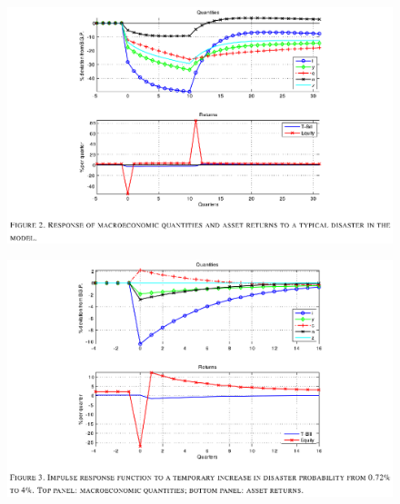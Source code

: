 \documentclass{beamer}
\begin{document}
\begin{frame}
\begin{figure}
    \includegraphics[scale=.8]{gourio2.eps}
  \end{figure}
\end{frame}

\begin{frame}
\begin{figure}
    \includegraphics[scale=.8]{gourio3.eps}
  \end{figure}
\end{frame}
\end{document}
